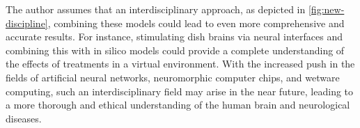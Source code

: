 \documentclass[10pt]{article}
\begin{document}
\begin{sloppypar}
  The author assumes that an interdisciplinary approach, as depicted in \autoref{fig:new-discipline}, combining these models could lead to even more comprehensive and accurate results. For instance, stimulating dish brains via neural interfaces and combining this with in silico models could provide a complete understanding of the effects of treatments in a virtual environment. With the increased push in the fields of artificial neural networks, neuromorphic computer chips, and wetware computing, such an interdisciplinary field may arise in the near future, leading to a more thorough and ethical understanding of the human brain and neurological diseases.

  \pagebreak
  \singlespacing %
  
  

\end{sloppypar}
\end{document}
